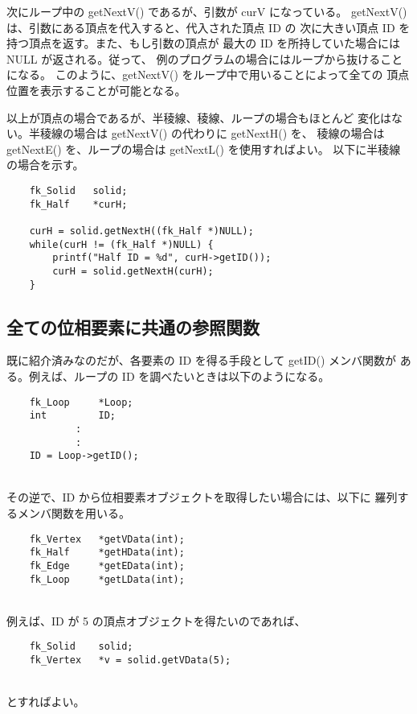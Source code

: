 次にループ中の getNextV() であるが、引数が curV になっている。
getNextV() は、引数にある頂点を代入すると、代入された頂点 ID の
次に大きい頂点 ID を持つ頂点を返す。また、もし引数の頂点が
最大の ID を所持していた場合には NULL が返される。従って、
例のプログラムの場合にはループから抜けることになる。
このように、getNextV() をループ中で用いることによって全ての
頂点位置を表示することが可能となる。

以上が頂点の場合であるが、半稜線、稜線、ループの場合もほとんど
変化はない。半稜線の場合は getNextV() の代わりに getNextH() を、
稜線の場合は getNextE() を、ループの場合は getNextL() を使用すればよい。
以下に半稜線の場合を示す。
\\
\begin{breakbox}
\begin{verbatim}
    fk_Solid   solid;
    fk_Half    *curH;

    curH = solid.getNextH((fk_Half *)NULL);
    while(curH != (fk_Half *)NULL) {
        printf("Half ID = %d", curH->getID());
        curH = solid.getNextH(curH);
    }
\end{verbatim}
\end{breakbox}
\subsection{全ての位相要素に共通の参照関数}
既に紹介済みなのだが、各要素の ID を得る手段として getID() メンバ関数が
ある。例えば、ループの ID を調べたいときは以下のようになる。
\\
\begin{screen}
\begin{verbatim}
    fk_Loop     *Loop;
    int         ID;
            :
            :
    ID = Loop->getID();
\end{verbatim}
\end{screen}
~ \\
その逆で、ID から位相要素オブジェクトを取得したい場合には、以下に
羅列するメンバ関数を用いる。
\\
\begin{screen}
\begin{verbatim}
    fk_Vertex   *getVData(int);
    fk_Half     *getHData(int);
    fk_Edge     *getEData(int);
    fk_Loop     *getLData(int);
\end{verbatim}
\end{screen}
~ \\
例えば、ID が 5 の頂点オブジェクトを得たいのであれば、
\\
\begin{screen}
\begin{verbatim}
    fk_Solid    solid;
    fk_Vertex   *v = solid.getVData(5);
\end{verbatim}
\end{screen}
~ \\
とすればよい。
